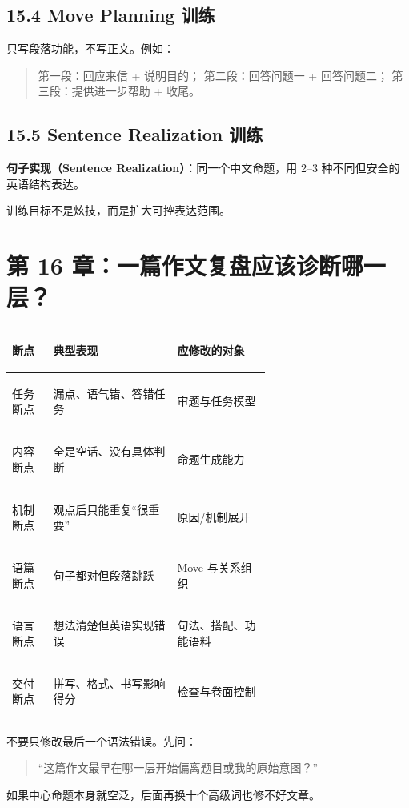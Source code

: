 \documentclass[11pt,a4paper]{ctexart}
\newcommand{\term}[2]{\textbf{#1（#2）}}
\begin{document}
\subsection{15.4 Move Planning 训练}
只写段落功能，不写正文。例如：
\begin{quote}
第一段：回应来信 + 说明目的；\quad
第二段：回答问题一 + 回答问题二；\quad
第三段：提供进一步帮助 + 收尾。
\end{quote}

\subsection{15.5 Sentence Realization 训练}
\term{句子实现}{Sentence Realization}：同一个中文命题，用 2--3 种不同但安全的英语结构表达。

训练目标不是炫技，而是扩大可控表达范围。

\section{第 16 章：一篇作文复盘应该诊断哪一层？}

\begin{center}
\small
\begin{tabularx}{\linewidth}{>{\bfseries\raggedright\arraybackslash}p{0.16\linewidth} >{\raggedright\arraybackslash}p{0.48\linewidth} Y}
\toprule
断点 & 典型表现 & 应修改的对象 \\
\midrule
任务断点 & 漏点、语气错、答错任务 & 审题与任务模型 \\
内容断点 & 全是空话、没有具体判断 & 命题生成能力 \\
机制断点 & 观点后只能重复“很重要” & 原因/机制展开 \\
语篇断点 & 句子都对但段落跳跃 & Move 与关系组织 \\
语言断点 & 想法清楚但英语实现错误 & 句法、搭配、功能语料 \\
交付断点 & 拼写、格式、书写影响得分 & 检查与卷面控制 \\
\bottomrule
\end{tabularx}
\end{center}

\begin{exam}
不要只修改最后一个语法错误。先问：
\begin{quote}
“这篇作文最早在哪一层开始偏离题目或我的原始意图？”
\end{quote}
如果中心命题本身就空泛，后面再换十个高级词也修不好文章。
\end{exam}
\end{document}
